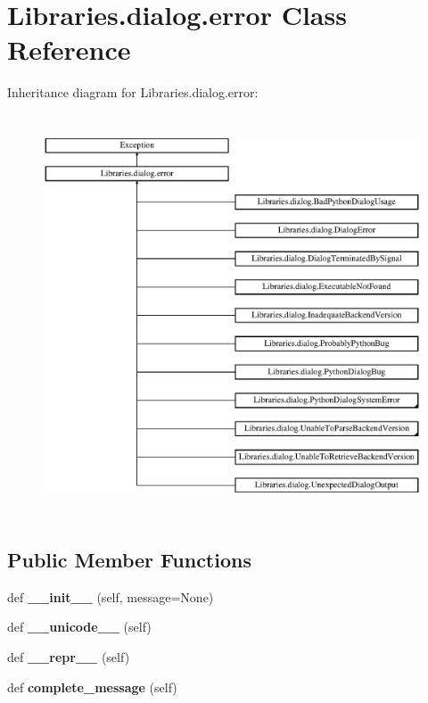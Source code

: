 \hypertarget{class_libraries_1_1dialog_1_1error}{}\section{Libraries.\+dialog.\+error Class Reference}
\label{class_libraries_1_1dialog_1_1error}
Inheritance diagram for Libraries.\+dialog.\+error\+:\begin{figure}[H]
\begin{center}
\leavevmode
\includegraphics[height=11.934426cm]{class_libraries_1_1dialog_1_1error}
\end{center}
\end{figure}
\subsection*{Public Member Functions}
\begin{DoxyCompactItemize}
\item 
def {\bfseries \+\_\+\+\_\+init\+\_\+\+\_\+} (self, message=None)\hypertarget{class_libraries_1_1dialog_1_1error_a20454e23e311a78e4ac1563978e11f3b}{}\label{class_libraries_1_1dialog_1_1error_a20454e23e311a78e4ac1563978e11f3b}

\item 
def {\bfseries \+\_\+\+\_\+unicode\+\_\+\+\_\+} (self)\hypertarget{class_libraries_1_1dialog_1_1error_a91d710f135bba566f9ccd0653467d708}{}\label{class_libraries_1_1dialog_1_1error_a91d710f135bba566f9ccd0653467d708}

\item 
def {\bfseries \+\_\+\+\_\+repr\+\_\+\+\_\+} (self)\hypertarget{class_libraries_1_1dialog_1_1error_aa5047c58062e355c49878cfec01db357}{}\label{class_libraries_1_1dialog_1_1error_aa5047c58062e355c49878cfec01db357}

\item 
def {\bfseries complete\+\_\+message} (self)\hypertarget{class_libraries_1_1dialog_1_1error_a32fe124d87d885ec98c80f90c686bbda}{}\label{class_libraries_1_1dialog_1_1error_a32fe124d87d885ec98c80f90c686bbda}

\end{DoxyCompactItemize}
